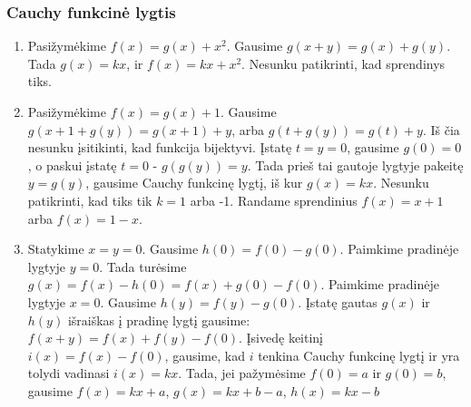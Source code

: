 \subsubsection*{Cauchy funkcinė lygtis}
\begin{enumerate} 
\item 
Pasižymėkime $f(x)=g(x)+x^2$. Gausime $g(x+y)=g(x)+g(y)$. Tada
$g(x)=kx$, ir $f(x)=kx+x^2$. Nesunku patikrinti, kad sprendinys tiks.
\item 
Pasižymėkime $f(x)=g(x)+1$. Gausime $g(x+1+g(y))=g(x+1)+y$, arba
$g(t+g(y))=g(t)+y$. Iš čia nesunku įsitikinti, kad funkcija bijektyvi.
Įstatę $t=y=0$, gausime $g(0)=0$, o paskui įstatę $t=0$ - $g(g(y))=y$.
Tada prieš tai gautoje lygtyje pakeitę $y=g(y)$, gausime Cauchy
funkcinę lygtį, iš kur $g(x)=kx$. Nesunku patikrinti, kad tiks tik
$k=1$ arba -1. Randame sprendinius $f(x)=x+1$ arba $f(x)=1-x$.
\item 
Statykime $x=y=0$. Gausime $h(0)=f(0)-g(0)$. Paimkime pradinėje
lygtyje $y=0$. Tada turėsime $g(x)=f(x)-h(0)=f(x)+g(0)-f(0)$. Paimkime
pradinėje lygtyje $x=0$. Gausime $h(y)=f(y)-g(0)$. Įstatę gautas
$g(x)$ ir $h(y)$ išraiškas į pradinę lygtį gausime:
$f(x+y)=f(x)+f(y)-f(0)$. Įsivedę keitinį $i(x)=f(x)-f(0)$, gausime,
kad $i$ tenkina Cauchy funkcinę lygtį ir yra tolydi vadinasi
$i(x)=kx$. Tada, jei pažymėsime $f(0)=a$ ir $g(0)=b$, gausime
$f(x)=kx+a$, $g(x)=kx+b-a$, $h(x)=kx-b$


\end{enumerate}
